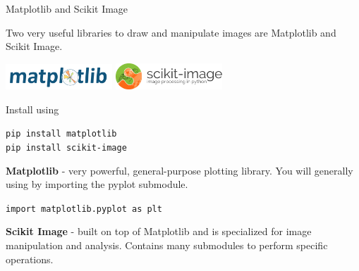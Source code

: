 \documentclass[9pt, aspectratio=169]{beamer}
\begin{document}
\begin{frame}
    {Matplotlib and Scikit Image}

    Two very useful libraries to draw and manipulate images are Matplotlib and Scikit Image.
    \begin{center}
        \includegraphics[width=0.3\textwidth]{matplotlib_logo.png}
        \includegraphics[width=0.3\textwidth]{skimage_logo.png}
    \end{center}

    Install using
    \begin{codebox}
        \texttt{pip install matplotlib}\\
        \texttt{pip install scikit-image}
    \end{codebox}
    \pause
    \textbf{Matplotlib} - very powerful, general-purpose plotting library. You will generally using by importing the pyplot submodule.\\
    \begin{codebox}
        \texttt{import matplotlib.pyplot as plt}
    \end{codebox}
    \pause
    \textbf{Scikit Image} - built on top of Matplotlib and is specialized for image manipulation and analysis. Contains many submodules to perform specific operations.\\
\end{frame}
\end{document}
